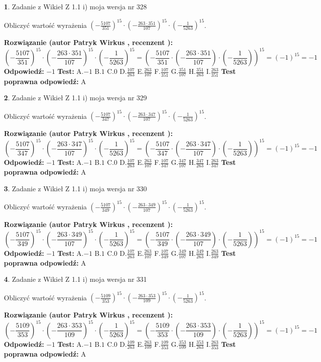 \documentclass[12pt, a4paper]{article}
\theoremstyle{definition} %
\newtheorem{zad}{}
\newcommand{\zadStart}[1]{\begin{zad}#1\newline}
\newcommand{\zadStop}{\end{zad}}
\newcommand{\rozwStart}[2]{\noindent \textbf{Rozwiązanie (autor #1 , recenzent #2): }\newline}
\newcommand{\rozwStop}{\newline}
\newcommand{\odpStart}{\noindent \textbf{Odpowiedź:}\newline}
\newcommand{\odpStop}{\newline}
\newcommand{\testStart}{\noindent \textbf{Test:}\newline}
\newcommand{\testStop}{\newline}
\newcommand{\kluczStart}{\noindent \textbf{Test poprawna odpowiedź:}\newline}
\newcommand{\kluczStop}{\newline}
\begin{document}
\zadStart{Zadanie z Wikieł Z 1.1 i) moja wersja nr 328}

Obliczyć wartość wyrażenia $(-\frac{5107}{351})^{15} \cdot (-\frac{263 \cdot 351}{107})^{15} \cdot (-\frac{1}{5263})^{15}$.
\zadStop
\rozwStart{Patryk Wirkus}{}
$$(-\frac{5107}{351})^{15} \cdot (-\frac{263 \cdot 351}{107})^{15} \cdot (-\frac{1}{5263})^{15} = (-\frac{5107}{351} \cdot (-\frac{263 \cdot 351}{107}) \cdot (-\frac{1}{5263}))^{15} = (-1)^{15} = -1$$
\rozwStop
\odpStart
$-1$
\odpStop
\testStart
A.$-1$ B.$1$ C.$0$ D.$\frac{107}{263}$ E.$\frac{263}{107}$
F.$\frac{107}{351}$ G.$\frac{351}{107}$
H.$\frac{351}{263}$
I.$\frac{263}{351}$
\testStop
\kluczStart
A
\kluczStop



\zadStart{Zadanie z Wikieł Z 1.1 i) moja wersja nr 329}

Obliczyć wartość wyrażenia $(-\frac{5107}{347})^{15} \cdot (-\frac{263 \cdot 347}{107})^{15} \cdot (-\frac{1}{5263})^{15}$.
\zadStop
\rozwStart{Patryk Wirkus}{}
$$(-\frac{5107}{347})^{15} \cdot (-\frac{263 \cdot 347}{107})^{15} \cdot (-\frac{1}{5263})^{15} = (-\frac{5107}{347} \cdot (-\frac{263 \cdot 347}{107}) \cdot (-\frac{1}{5263}))^{15} = (-1)^{15} = -1$$
\rozwStop
\odpStart
$-1$
\odpStop
\testStart
A.$-1$ B.$1$ C.$0$ D.$\frac{107}{263}$ E.$\frac{263}{107}$
F.$\frac{107}{347}$ G.$\frac{347}{107}$
H.$\frac{347}{263}$
I.$\frac{263}{347}$
\testStop
\kluczStart
A
\kluczStop



\zadStart{Zadanie z Wikieł Z 1.1 i) moja wersja nr 330}

Obliczyć wartość wyrażenia $(-\frac{5107}{349})^{15} \cdot (-\frac{263 \cdot 349}{107})^{15} \cdot (-\frac{1}{5263})^{15}$.
\zadStop
\rozwStart{Patryk Wirkus}{}
$$(-\frac{5107}{349})^{15} \cdot (-\frac{263 \cdot 349}{107})^{15} \cdot (-\frac{1}{5263})^{15} = (-\frac{5107}{349} \cdot (-\frac{263 \cdot 349}{107}) \cdot (-\frac{1}{5263}))^{15} = (-1)^{15} = -1$$
\rozwStop
\odpStart
$-1$
\odpStop
\testStart
A.$-1$ B.$1$ C.$0$ D.$\frac{107}{263}$ E.$\frac{263}{107}$
F.$\frac{107}{349}$ G.$\frac{349}{107}$
H.$\frac{349}{263}$
I.$\frac{263}{349}$
\testStop
\kluczStart
A
\kluczStop



\zadStart{Zadanie z Wikieł Z 1.1 i) moja wersja nr 331}

Obliczyć wartość wyrażenia $(-\frac{5109}{353})^{15} \cdot (-\frac{263 \cdot 353}{109})^{15} \cdot (-\frac{1}{5263})^{15}$.
\zadStop
\rozwStart{Patryk Wirkus}{}
$$(-\frac{5109}{353})^{15} \cdot (-\frac{263 \cdot 353}{109})^{15} \cdot (-\frac{1}{5263})^{15} = (-\frac{5109}{353} \cdot (-\frac{263 \cdot 353}{109}) \cdot (-\frac{1}{5263}))^{15} = (-1)^{15} = -1$$
\rozwStop
\odpStart
$-1$
\odpStop
\testStart
A.$-1$ B.$1$ C.$0$ D.$\frac{109}{263}$ E.$\frac{263}{109}$
F.$\frac{109}{353}$ G.$\frac{353}{109}$
H.$\frac{353}{263}$
I.$\frac{263}{353}$
\testStop
\kluczStart
A
\kluczStop
\end{document}

